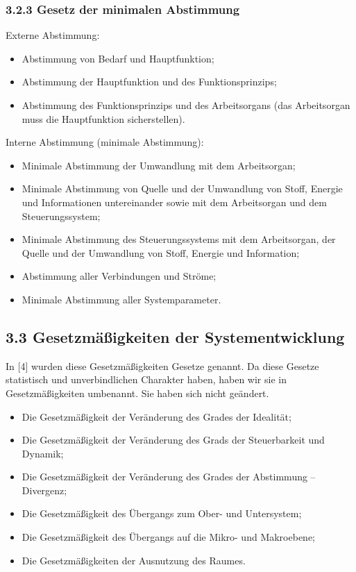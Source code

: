 \documentclass[11pt,a4paper]{article}
\begin{document}
\subsubsection{3.2.3 Gesetz der minimalen Abstimmung}
Externe Abstimmung:
\begin{itemize}
\item Abstimmung von Bedarf und Hauptfunktion;
\item Abstimmung der Hauptfunktion und des Funktionsprinzips;
\item Abstimmung des Funktionsprinzips und des Arbeitsorgans (das Arbeitsorgan
  muss die Hauptfunktion sicherstellen).
\end{itemize}
Interne Abstimmung (minimale Abstimmung):
\begin{itemize}
\item Minimale Abstimmung der Umwandlung mit dem Arbeitsorgan;
\item Minimale Abstimmung von Quelle und der Umwandlung von Stoff, Energie und
  Informationen untereinander sowie mit dem Arbeitsorgan und dem
  Steuerungssystem;
\item Minimale Abstimmung des Steuerungssystems mit dem Arbeitsorgan, der
  Quelle und der Umwandlung von Stoff, Energie und Information;
 \item Abstimmung aller Verbindungen und Ströme;
 \item Minimale Abstimmung aller Systemparameter.
\end{itemize}

\subsection{3.3 Gesetzmäßigkeiten der Systementwicklung}

In [4] wurden diese Gesetzmäßigkeiten Gesetze genannt. Da diese Gesetze
statistisch und unverbindlichen Charakter haben, haben wir sie in
Gesetzmäßigkeiten umbenannt. Sie haben sich nicht geändert.
\begin{itemize}
\item Die Gesetzmäßigkeit der Veränderung des Grades der Idealität;
\item Die Gesetzmäßigkeit der Veränderung des Grads der Steuerbarkeit und
  Dynamik;
\item Die Gesetzmäßigkeit der Veränderung des Grades der Abstimmung --
  Divergenz;
\item Die Gesetzmäßigkeit des Übergangs zum Ober- und Untersystem;
\item Die Gesetzmäßigkeit des Übergangs auf die Mikro- und Makroebene;
\item Die Gesetzmäßigkeiten der Ausnutzung des Raumes.
\end{itemize}
\end{document}

